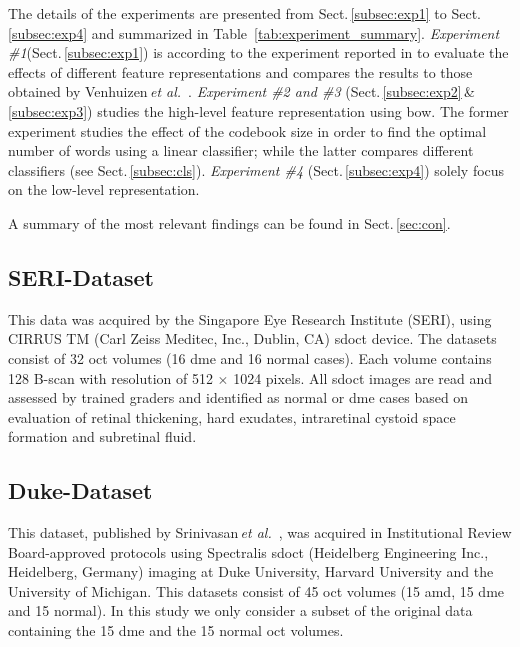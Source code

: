 The details of the experiments are presented from Sect.\,\ref{subsec:exp1} to Sect.\,\ref{subsec:exp4} and summarized in Table~\ref{tab:experiment_summary}.
\emph{Experiment \#1}(Sect.\,\ref{subsec:exp1}) is according to the experiment reported in \cite{Lemaintre2015miccaiOCT} to evaluate the effects of different feature representations and compares the results to those obtained by Venhuizen\,\emph{et al.}~\cite{Venhuizen2015}.
\emph{Experiment \#2 and \#3} (Sect.\,\ref{subsec:exp2}\,\&\,\ref{subsec:exp3}) studies the high-level feature representation using \ac{bow}.
The former experiment studies the effect of the codebook size in order to find the optimal number of words using a linear classifier; while the latter compares different classifiers (see Sect.\,\ref{subsec:cls}).
\emph{Experiment \#4} (Sect.\,\ref{subsec:exp4}) solely focus on the low-level representation.

A summary of the most relevant findings can be found in Sect.\,\ref{sec:con}.





\subsection{SERI-Dataset}\label{sec:exp:dataset:seri}
This data was acquired by the Singapore Eye Research Institute (SERI), using CIRRUS TM (Carl Zeiss Meditec, Inc., Dublin, CA) \ac{sdoct} device. The datasets consist of 32 \ac{oct} volumes (16 \ac{dme} and 16 normal cases). Each volume contains 128 B-scan with resolution of 512 $\times$ 1024 pixels.
All \ac{sdoct} images are read and assessed by trained graders and identified as normal or \ac{dme} cases based on evaluation of retinal thickening, hard exudates, intraretinal cystoid space formation and subretinal fluid.

\subsection{Duke-Dataset} \label{sec:exp:dataset:duke}
This dataset, published by Srinivasan\,\emph{et al.}~\cite{Srinivasan2014}, was acquired in Institutional Review Board-approved protocols using Spectralis \ac{sdoct} (Heidelberg Engineering Inc., Heidelberg, Germany) imaging at Duke University, Harvard University and the University of Michigan.
This datasets consist of 45 \ac{oct} volumes (15 \ac{amd}, 15 \ac{dme} and 15 normal). In this study we only consider a subset of the original data containing the 15 \ac{dme} and the 15 normal \ac{oct} volumes.


